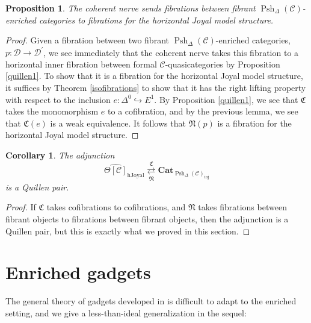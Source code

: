 \documentclass{amsart}
\numberwithin{equation}{section}
\theoremstyle{plain}   %
\newtheorem{prop}[subsection]{Proposition}
\newtheorem{cor}[subsection]{Corollary}
\theoremstyle{remark}
\theoremstyle{plain}
\DeclareMathOperator{\Psh}{Psh}
\newcommand{\Cat}{\ensuremath{\mathbf{Cat}}}
\newcommand{\C}{\ensuremath{\mathcal{C}}}
\newcommand{\cellset}{\ensuremath{\widehat{\Theta[\mathcal{C}]}}}
\begin{document}
\begin{prop}
	The coherent nerve sends fibrations between fibrant \(\Psh_\Delta(\C)\)-enriched categories to fibrations for the horizontal Joyal model structure.
\end{prop}
\begin{proof}
	Given a fibration between two fibrant \(\Psh_\Delta(\C)\)-enriched categories, \(p:\mathcal{D}\to \mathcal{D}^\prime\), we see immediately that the coherent nerve takes this fibration to a horizontal inner fibration between formal \(\C\)-quasicategories by Proposition \ref{quillen1}.  To show that it is a fibration for the horizontal Joyal model structure, it suffices by Theorem \ref{isofibrations} to show that it has the right lifting property with respect to the inclusion \(e:\Delta^0 \hookrightarrow E^1\). By Proposition \ref{quillen1}, we see that \(\mathfrak{C}\) takes the monomorphism \(e\) to a cofibration, and by the previous lemma, we see that \(\mathfrak{C}(e)\) is a weak equivalence.  It follows that \(\mathfrak{N}(p)\) is a fibration for the horizontal Joyal model structure.
\end{proof}

\begin{cor}\label{horizquillen}
	The adjunction 
	\[\cellset_{\mathrm{hJoyal}} \underset{\mathfrak{N}}{\overset{\mathfrak{C}}{\rightleftarrows}} \Cat_{\Psh_\Delta(\C)_{\mathrm{inj}}}\]
	is a Quillen pair.
\end{cor}
\begin{proof}
	If \(\mathfrak{C}\) takes cofibrations to cofibrations, and \(\mathfrak{N}\) takes fibrations between fibrant objects to fibrations between fibrant objects, then the adjunction is a Quillen pair, but this is exactly what we proved in this section.
\end{proof}

\section{Enriched gadgets}
The general theory of gadgets developed in \cite{ds1} is difficult to adapt to the enriched setting, and we give a less-than-ideal generalization in the sequel:
\end{document}
